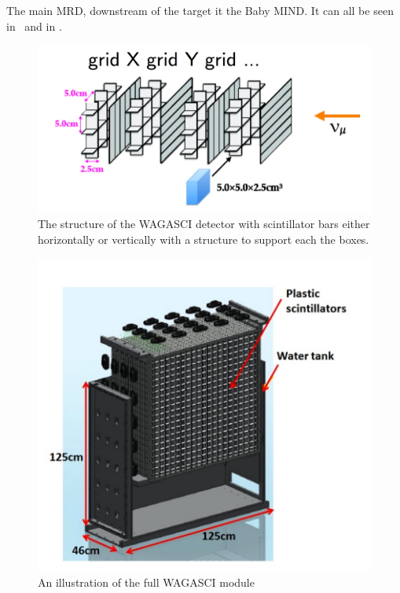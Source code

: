 The main MRD, downstream of the target it the Baby MIND. It can all be seen in~ and in . 

\begin{figure}[h!]
\centering
\includegraphics[width=\textwidth]{figures/structure2.jpeg}
\caption{The structure of the WAGASCI detector with scintillator bars either horizontally or vertically with a structure to support each the boxes.}
\label{fig:StrucWAGASCI}
\end{figure}

\begin{figure}[h!]
\centering
\includegraphics[width=\textwidth]{figures/NeutrinoChap/NuFactTalk/WAGASCIm2.jpeg}
\caption{An illustration of the full WAGASCI module}
\label{fig:WAGASCImod}
\end{figure}

